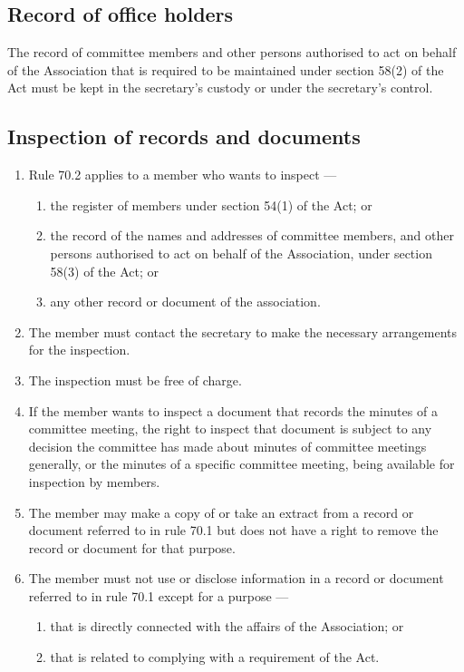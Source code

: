 \documentclass[../constitution.tex]{subfiles}
\begin{document}
\hypertarget{record-of-office-holders}{%
\subsection{Record of office holders}\label{record-of-office-holders}}

The record of committee members and other persons authorised to act on behalf of the Association that is required to be maintained under section 58(2) of the Act must be kept in the secretary's custody or under the secretary's control.

\hypertarget{inspection-of-records-and-documents}{%
\subsection{Inspection of records and documents}\label{inspection-of-records-and-documents}}

\begin{enumerate}

\item Rule 70.2 applies to a member who wants to inspect ---

  \begin{enumerate}
  
  \item the register of members under section 54(1) of the Act; or
  \item the record of the names and addresses of committee members, and other persons authorised to act on behalf of the Association, under section 58(3) of the Act; or
  \item any other record or document of the association.
  \end{enumerate}
\item The member must contact the secretary to make the necessary arrangements for the inspection.
\item The inspection must be free of charge.
\item If the member wants to inspect a document that records the minutes of a committee meeting, the right to inspect that document is subject to any decision the committee has made about minutes of committee meetings generally, or the minutes of a specific committee meeting, being available for inspection by members.
\item The member may make a copy of or take an extract from a record or document referred to in rule 70.1 but does not have a right to remove the record or document for that purpose.
\item The member must not use or disclose information in a record or document referred to in rule 70.1 except for a purpose ---

  \begin{enumerate}
  
  \item that is directly connected with the affairs of the Association; or
  \item that is related to complying with a requirement of the Act.
  \end{enumerate}
\end{enumerate}
\end{document}
